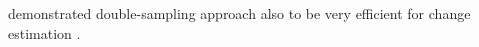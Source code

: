 demonstrated double-sampling approach also to be very efficient for change estimation \citep{massey2015b}.\par






%
%
%
%



